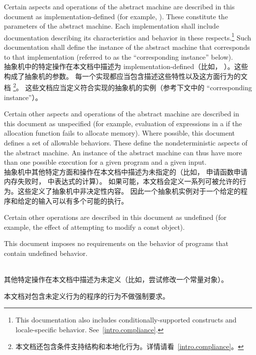 %
\pnum
Certain aspects and operations of the abstract machine are described in this
document as implementation-defined (for example,
). These constitute the parameters of the abstract machine.
Each implementation shall include documentation describing its characteristics
and behavior in these respects.\footnote{This documentation also includes
conditionally-supported constructs and locale-specific behavior.
See~\ref{intro.compliance}.} Such documentation shall define the instance of the
abstract machine that corresponds to that implementation (referred to as the
``corresponding instance'' below). \\
抽象机中的特定操作在本文档中描述为 implementation-defined（比如，
）。这些构成了抽象机的参数。
每一个实现都应当包含描述这些特性以及这方面行为的文档
\footnote{本文档还包含条件支持结构和本地化行为。详情请看~\ref{intro.compliance}。}。
这些文档应当定义符合实现的抽象机的实例（参考下文中的 ``corresponding instance''）。

%
\pnum
Certain other aspects and operations of the abstract machine are
described in this document as unspecified (for example,
evaluation of expressions in a  if the allocation
function fails to allocate memory). Where possible, this
document defines a set of allowable behaviors. These
define the nondeterministic aspects of the abstract machine. An instance
of the abstract machine can thus have more than one possible execution
for a given program and a given input. \\
抽象机中其他特定方面和操作在本文档中描述为未指定的（比如，
申请函数申请内存失败时， 中表达式的计算）。
如果可能，本文档会定义一系列可被允许的行为。这些定义了抽象机中非决定性内容。
因此一个抽象机实例对于一个给定的程序和给定的输入可以有多个可能的执行。

%
\pnum
Certain other operations are described in this document as
undefined (for example, the effect of
attempting to modify a const object).
\begin{note} This document imposes no requirements on the
behavior of programs that contain undefined behavior. \end{note} \\
其他特定操作在本文档中描述为未定义（比如，尝试修改一个常量对象）。
\begin{note} 本文档对包含未定义行为的程序的行为不做强制要求。\end{note}


